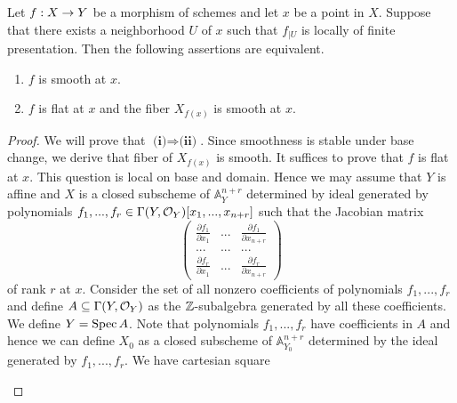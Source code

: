 \begin{theorem}\label{theorem:smooth_is_flat_with_smooth_fibers}
Let $f:X\rightarrow Y$ be a morphism of schemes and let $x$ be a point in $X$. Suppose that there exists a neighborhood $U$ of $x$ such that $f_{\mid U}$ is locally of finite presentation. Then the following assertions are equivalent.
\begin{enumerate}[label=\emph{\textbf{(\roman*)}}, leftmargin=3.0em]
\item $f$ is smooth at $x$.
\item $f$ is flat at $x$ and the fiber $X_{f(x)}$ is smooth at $x$.
\end{enumerate}
\end{theorem}
\begin{proof}
We will prove that $\textbf{(i)}\Rightarrow \textbf{(ii)}$. Since smoothness is stable under base change, we derive that fiber of $X_{f(x)}$ is smooth. It suffices to prove that $f$ is flat at $x$. This question is local on base and domain. Hence we may assume that $Y$ is affine and $X$ is a closed subscheme of $\mathbb{A}^{n+r}_Y$ determined by ideal generated by polynomials $f_1,...,f_r\in \Gamma(Y,{\mathcal O}_Y)[x_1,...,x_{n+r}]$ such that the Jacobian matrix
$$\left( \begin{array}{ccc}
\frac{\partial f_1}{\partial x_1} & ... & \frac{\partial f_1}{\partial x_{n+r}} \\
... &...  &...  \\
\frac{\partial f_r}{\partial x_{1}} &...  & \frac{\partial f_r}{\partial x_{n+r}}\end{array} \right)$$
of rank $r$ at $x$. Consider the set of all nonzero coefficients of polynomials $f_1,...,f_r$ and define $A \subseteq \Gamma(Y,{\mathcal O}_Y)$ as the ${\mathbb Z}$-subalgebra generated by all these coefficients. We define $Y = \mathrm{Spec}\, A$. Note that polynomials $f_1,...,f_r$ have coefficients in $A$ and hence we can define $X_0$ as a closed subscheme of $\mathbb{A}^{n+r}_{Y_0}$ determined by the ideal generated by $f_1,...,f_r$. We have cartesian square
\begin{center}
\end{center}
\end{proof}
